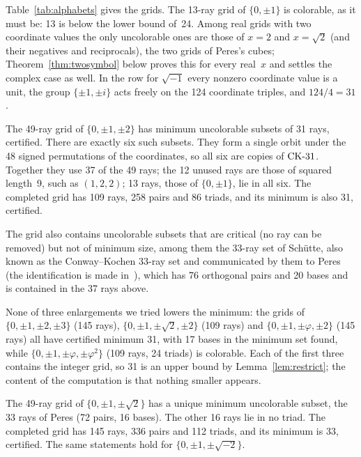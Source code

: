 Table~\ref{tab:alphabets} gives the grids.  The 13-ray grid of $\{0,\pm1\}$ is colorable, as
it must be: 13 is below the lower bound of~24.  Among real grids with two coordinate values the
only uncolorable ones are those of $x=2$ and $x=\sqrt2$ (and their negatives and
reciprocals), the two grids of Peres's cubes; Theorem~\ref{thm:twosymbol} below proves this
for every real~$x$ and settles the complex case as well.
In the row for $\sqrt{-1}$ every nonzero coordinate value is a unit, the group $\{\pm1,\pm i\}$ acts
freely on the 124 coordinate triples, and $124/4=31$.

\begin{fact}\label{fact:integer}
The 49-ray grid of $\{0,\pm1,\pm2\}$ has minimum uncolorable subsets of 31 rays, certified.  There
are exactly six such subsets.  They form a single orbit under the 48 signed permutations of the
coordinates, so all six are copies of $\mathrm{CK}\text{-}31$.  Together they use 37 of the 49 rays; the 12 unused
rays are those of squared length~9, such as $(1,2,2)$; 13 rays, those of $\{0,\pm1\}$, lie in all
six.  The completed grid has 109 rays, 258 pairs and 86 triads, and its minimum is also 31,
certified.
\end{fact}

The grid also contains uncolorable subsets
that are critical (no ray can be removed) but not of minimum size, among them the 33-ray set
of Sch\"utte, also known as the Conway--Kochen 33-ray set and communicated by them to
Peres~\cite{Peres1991} (the identification is made in~\cite{TrandafirCabello2025}), which has 76
orthogonal pairs and
20 bases and is contained in the 37 rays above.

None of three enlargements we tried lowers the minimum: the grids of $\{0,\pm1,\pm2,\pm3\}$ (145 rays),
$\{0,\pm1,\pm\sqrt2,\pm2\}$ (109 rays) and $\{0,\pm1,\pm\varphi,\pm2\}$ (145 rays) all have
certified minimum 31, with 17 bases in the minimum set found, while
$\{0,\pm1,\pm\varphi,\pm\varphi^2\}$ (109 rays, 24 triads) is colorable.  Each of the first three
contains the integer grid, so 31 is an upper bound by Lemma~\ref{lem:restrict}; the content of
the computation is that nothing smaller appears.

\begin{fact}\label{fact:peres}
The 49-ray grid of $\{0,\pm1,\pm\sqrt2\}$ has a unique minimum uncolorable subset, the 33 rays of
Peres (72 pairs, 16 bases).  The other 16 rays lie in no triad.  The completed grid has 145 rays,
336 pairs and 112 triads, and its minimum is 33, certified.  The same statements hold for
$\{0,\pm1,\pm\sqrt{-2}\}$.
\end{fact}

